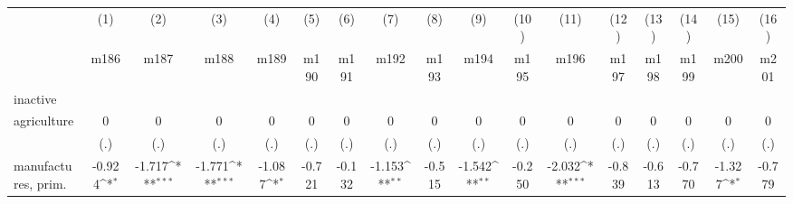{
\def\sym#1{\ifmmode^{#1}\else\(^{#1}\)\fi}
\begin{tabular}{l*{16}{c}}
\hline\hline
                    &\multicolumn{1}{c}{(1)}&\multicolumn{1}{c}{(2)}&\multicolumn{1}{c}{(3)}&\multicolumn{1}{c}{(4)}&\multicolumn{1}{c}{(5)}&\multicolumn{1}{c}{(6)}&\multicolumn{1}{c}{(7)}&\multicolumn{1}{c}{(8)}&\multicolumn{1}{c}{(9)}&\multicolumn{1}{c}{(10)}&\multicolumn{1}{c}{(11)}&\multicolumn{1}{c}{(12)}&\multicolumn{1}{c}{(13)}&\multicolumn{1}{c}{(14)}&\multicolumn{1}{c}{(15)}&\multicolumn{1}{c}{(16)}\\
                    &\multicolumn{1}{c}{m186}&\multicolumn{1}{c}{m187}&\multicolumn{1}{c}{m188}&\multicolumn{1}{c}{m189}&\multicolumn{1}{c}{m190}&\multicolumn{1}{c}{m191}&\multicolumn{1}{c}{m192}&\multicolumn{1}{c}{m193}&\multicolumn{1}{c}{m194}&\multicolumn{1}{c}{m195}&\multicolumn{1}{c}{m196}&\multicolumn{1}{c}{m197}&\multicolumn{1}{c}{m198}&\multicolumn{1}{c}{m199}&\multicolumn{1}{c}{m200}&\multicolumn{1}{c}{m201}\\
\hline
inactive            &                     &                     &                     &                     &                     &                     &                     &                     &                     &                     &                     &                     &                     &                     &                     &                     \\
agriculture         &           0         &           0         &           0         &           0         &           0         &           0         &           0         &           0         &           0         &           0         &           0         &           0         &           0         &           0         &           0         &           0         \\
                    &         (.)         &         (.)         &         (.)         &         (.)         &         (.)         &         (.)         &         (.)         &         (.)         &         (.)         &         (.)         &         (.)         &         (.)         &         (.)         &         (.)         &         (.)         &         (.)         \\
[1em]
manufactures, prim. &      -0.924\sym{*}  &      -1.717\sym{***}&      -1.771\sym{***}&      -1.087\sym{*}  &      -0.721         &      -0.132         &      -1.153\sym{**} &      -0.515         &      -1.542\sym{**} &      -0.250         &      -2.032\sym{***}&      -0.839         &      -0.613         &      -0.770         &      -1.327\sym{*}  &      -0.779         \\

\end{tabular}}
